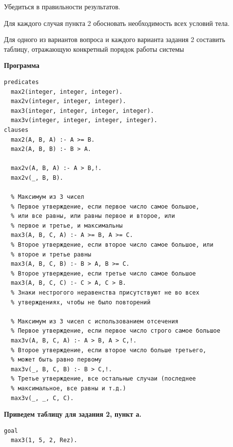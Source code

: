 \documentclass[a4paper,14pt]{extreport} %
\begin{document}
Убедиться в правильности результатов.

Для каждого случая пункта 2 обосновать необходимость всех условий тела. 

Для одного из вариантов вопроса и каждого варианта задания 2 составить таблицу, отражающую конкретный порядок работы системы

\hfill

\textbf{Программа}

\begin{lstlisting}
predicates
  max2(integer, integer, integer).
  max2v(integer, integer, integer).
  max3(integer, integer, integer, integer).
  max3v(integer, integer, integer, integer).
clauses
  max2(A, B, A) :- A >= B.
  max2(A, B, B) :- B > A.
  
  max2v(A, B, A) :- A > B,!.
  max2v(_, B, B).
  
  % Максимум из 3 чисел
  % Первое утверждение, если первое число самое большое,  
  % или все равны, или равны первое и второе, или
  % первое и третье, и максимальны
  max3(A, B, C, A) :- A >= B, A >= C.
  % Второе утверждение, если второе число самое большое, или 
  % второе и третье равны
  max3(A, B, C, B) :- B > A, B >= C.
  % Второе утверждение, если третье число самое большое
  max3(A, B, C, C) :- C > A, C > B.
  % Знаки нестрогого неравенства присутствуют не во всех
  % утверждениях, чтобы не было повторений
  
  % Максимум из 3 чисел с использованием отсечения
  % Первое утверждение, если первое число строго самое большое
  max3v(A, B, C, A) :- A > B, A > C,!.
  % Второе утверждение, если второе число больше третьего,
  % может быть равно первому
  max3v(_, B, C, B) :- B > C,!.
  % Третье утверждение, все остальные случаи (последнее
  % максимальное, все равны и т.д.)
  max3v(_, _, C, C).
\end{lstlisting}

\textbf{Приведем таблицу для задания 2, пункт а. }
\begin{lstlisting}
goal
  max3(1, 5, 2, Rez).
\end{lstlisting}
\end{document}
